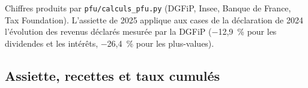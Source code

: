 
Chiffres produits par \texttt{pfu/calculs\_pfu.py} (DGFiP, Insee, Banque de France, Tax Foundation). L'assiette de
2025 applique aux cases de la déclaration de 2024 l'évolution des revenus déclarés mesurée par la DGFiP ($-$12,9~\%
pour les dividendes et les intérêts, $-$26,4~\% pour les plus-values).

\subsection{Assiette, recettes et taux cumulés}

